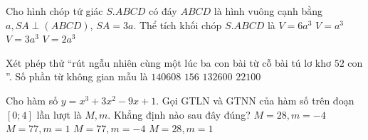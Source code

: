\begin{ex}%
	Cho hình chóp tứ giác $S.ABCD$ có đáy $ABCD$ là hình vuông cạnh bằng $a, SA \perp (ABCD)$, $SA=3a$. Thể tích khối chóp $S.ABCD$ là
	\choice 
	{$V=6a^3$}
	{\True $V=a^3$}
	{$V=3a^3$}
	{$V=2a^3$}
\end{ex}


\begin{ex}%
	Xét phép thử  ``rút ngẫu nhiên cùng một lúc ba con bài từ cỗ bài tú lơ khơ $52$ con ''. Số phần từ không gian mẫu là \choice 
	{$140608$}
	{$156$}
	{$132600$}
	{\True $22100$}
\end{ex}


\begin{ex}%
	Cho hàm số $y=x^3+3x^2-9x+1$. Gọi GTLN và GTNN của hàm số trên đoạn $\left[0;4\right]$ lần lượt là $ M,m $. Khẳng định nào sau đây đúng?
	\choice 
	{$M=28,m=-4$}
	{$M =77, m=1$}
	{\True $M=77,m=-4$}
	{$M=28, m=1$}
\end{ex}


